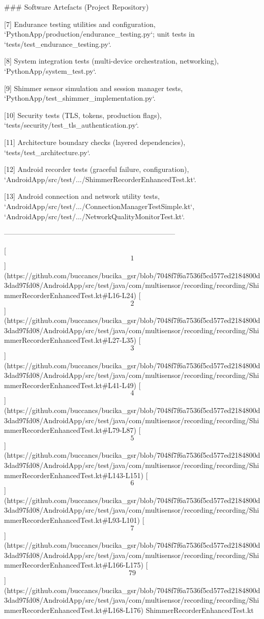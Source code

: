 \documentclass[12pt,a4paper]{article}
\begin{document}
{### Software Artefacts (Project Repository)

[7] Endurance testing utilities and configuration, `PythonApp/production/endurance_testing.py`; unit tests in `tests/test_endurance_testing.py`.

[8] System integration tests (multi-device orchestration, networking), `PythonApp/system_test.py`.

[9] Shimmer sensor simulation and session manager tests, `PythonApp/test_shimmer_implementation.py`.

[10] Security tests (TLS, tokens, production flags), `tests/security/test_tls_authentication.py`.

[11] Architecture boundary checks (layered dependencies), `tests/test_architecture.py`.

[12] Android recorder tests (graceful failure, configuration), `AndroidApp/src/test/.../ShimmerRecorderEnhancedTest.kt`.

[13] Android connection and network utility tests, `AndroidApp/src/test/.../ConnectionManagerTestSimple.kt`, `AndroidApp/src/test/.../NetworkQualityMonitorTest.kt`.

------------------------------------------------------------------------

[\[1\]](https://github.com/buccancs/bucika_gsr/blob/7048f7f6a7536f5cd577ed2184800d3dad97fd08/AndroidApp/src/test/java/com/multisensor/recording/recording/ShimmerRecorderEnhancedTest.kt#L16-L24)
[\[2\]](https://github.com/buccancs/bucika_gsr/blob/7048f7f6a7536f5cd577ed2184800d3dad97fd08/AndroidApp/src/test/java/com/multisensor/recording/recording/ShimmerRecorderEnhancedTest.kt#L27-L35)
[\[3\]](https://github.com/buccancs/bucika_gsr/blob/7048f7f6a7536f5cd577ed2184800d3dad97fd08/AndroidApp/src/test/java/com/multisensor/recording/recording/ShimmerRecorderEnhancedTest.kt#L41-L49)
[\[4\]](https://github.com/buccancs/bucika_gsr/blob/7048f7f6a7536f5cd577ed2184800d3dad97fd08/AndroidApp/src/test/java/com/multisensor/recording/recording/ShimmerRecorderEnhancedTest.kt#L79-L87)
[\[5\]](https://github.com/buccancs/bucika_gsr/blob/7048f7f6a7536f5cd577ed2184800d3dad97fd08/AndroidApp/src/test/java/com/multisensor/recording/recording/ShimmerRecorderEnhancedTest.kt#L143-L151)
[\[6\]](https://github.com/buccancs/bucika_gsr/blob/7048f7f6a7536f5cd577ed2184800d3dad97fd08/AndroidApp/src/test/java/com/multisensor/recording/recording/ShimmerRecorderEnhancedTest.kt#L93-L101)
[\[7\]](https://github.com/buccancs/bucika_gsr/blob/7048f7f6a7536f5cd577ed2184800d3dad97fd08/AndroidApp/src/test/java/com/multisensor/recording/recording/ShimmerRecorderEnhancedTest.kt#L166-L175)
[\[79\]](https://github.com/buccancs/bucika_gsr/blob/7048f7f6a7536f5cd577ed2184800d3dad97fd08/AndroidApp/src/test/java/com/multisensor/recording/recording/ShimmerRecorderEnhancedTest.kt#L168-L176)
ShimmerRecorderEnhancedTest.kt

}
\end{document}

